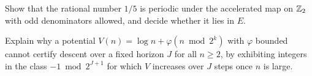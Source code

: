 \begin{exercise}
Show that the rational number $1/5$ is periodic under the accelerated map on
$\mathbb{Z}_2$ with odd denominators allowed, and decide whether it lies in $E$.
\end{exercise}

\begin{exercise}
Explain why a potential $V(n)=\log n+\varphi(n\bmod2^k)$ with $\varphi$ bounded
cannot certify descent over a fixed horizon $J$ for all $n\ge2$, by exhibiting
integers in the class $-1\bmod2^{J+1}$ for which $V$ increases over $J$ steps
once $n$ is large.
\end{exercise}
